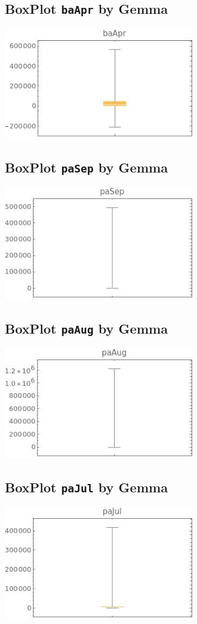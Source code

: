 \documentclass[a4paper]{article}
\begin{document}
\subsection{BoxPlot {\tt baApr} by Gemma}
\includegraphics[width=0.62\textwidth]{imgs/baApr.jpeg}



\subsection{BoxPlot {\tt paSep} by Gemma}
\includegraphics[width=0.62\textwidth]{imgs/paSep.jpeg}

\subsection{BoxPlot {\tt paAug} by Gemma}
\includegraphics[width=0.62\textwidth]{imgs/paAug.jpeg}

\subsection{BoxPlot {\tt paJul} by Gemma}
\includegraphics[width=0.62\textwidth]{imgs/paJul.jpeg}
\end{document}

